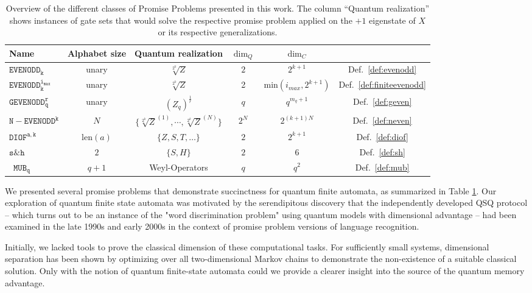 \documentclass[../main.tex]{subfiles}
\begin{document}
\begin{table}[h]
    \centering
    \begin{tabular}{l|ccccc}
        Name & Alphabet size & Quantum realization & $\dim_Q $ & $\dim_C$ &  \\ 
        \hline 
        $\operatorname{\mathtt{EVENODD_k}}$ & unary & $\sqrt[2^k]{Z}$ & $2$ & $2^{k+1}$&Def.~\ref{def:evenodd}\\ 
        $\operatorname{\mathtt{EVENODD_k^{i_{max}}}}$ & unary & $\sqrt[2^k]{Z}$ & 2 & $\mathrm{min}(i_{max},2^{k+1})$&Def.~\ref{def:finiteevenodd}\\
        $\operatorname{\mathtt{GEVENODD^r_q}}$ & unary & $(Z_q)^{\frac{1}{r}}$ & $q$ & $q^{m_q+1}$ &Def.~\ref{def:geven}\\
        $\operatorname{\mathtt{N-EVENODD^k}}$ &$N$ & $\{\sqrt[2^k]{Z}^{(1)},\cdots,\sqrt[2^k]{Z}^{(N)}\}$& $2^N$ & $2^{(k+1)N}$&Def.~\ref{def:neven}\\
        $\operatorname{\mathtt{DIOF^{a,k}}}$ & $\mathrm{len}(a)$&$\{Z,S,T,\dots\}$& $2$ &$2^{k+1}$& Def.~\ref{def:diof}\\
        $\mathtt{s\& h}$& $2$ & $\{S,H\}$ & $2$ & $6$ & Def.~\ref{def:sh}\\\
        $\mathtt{MUB_q}$& $q+1$ & Weyl-Operators & $q$ & $q^2$&Def.~\ref{def:mub}\\
    \end{tabular}
    \caption{Overview of the different classes of Promise Problems presented in this work. The column ``Quantum realization'' shows instances of gate sets that would solve the respective promise problem applied on the $+1$ eigenstate of $X$ or its respective generalizations. }
    \label{tab:PP-overview}
\end{table}

We presented several promise problems that demonstrate succinctness for quantum finite automata, as summarized in Table \ref{tab:PP-overview}. Our exploration of quantum finite state automata was motivated by the serendipitous discovery that the independently developed QSQ protocol -- which turns out to be an instance of the "word discrimination problem" using quantum models with dimensional advantage -- had been examined in the late 1990s and early 2000s in the context of promise problem versions of language recognition.

Initially, we lacked tools to prove the classical dimension of these computational tasks. For sufficiently small systems, dimensional separation has been shown by optimizing over all two-dimensional Markov chains to demonstrate the non-existence of a suitable classical solution. Only with the notion of quantum finite-state automata could we provide a clearer insight into the source of the quantum memory advantage. 
\end{document}
